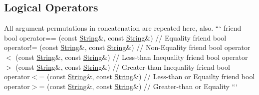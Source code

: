 \subsection*{Logical Operators }

All argument permutations in concatenation are repeated here, also. ``` friend bool operator== (const \hyperlink{classString}{String}\&, const \hyperlink{classString}{String}\&) // Equality friend bool operator!= (const \hyperlink{classString}{String}\&, const \hyperlink{classString}{String}\&) // Non-\/\-Equality friend bool operator$<$ (const \hyperlink{classString}{String}\&, const \hyperlink{classString}{String}\&) // Less-\/than Inequality friend bool operator$>$ (const \hyperlink{classString}{String}\&, const \hyperlink{classString}{String}\&) // Greater-\/than Inequality friend bool operator$<$= (const \hyperlink{classString}{String}\&, const \hyperlink{classString}{String}\&) // Less-\/than or Equailty friend bool operator$>$= (const \hyperlink{classString}{String}\&, const \hyperlink{classString}{String}\&) // Greater-\/than or Equality ``` 